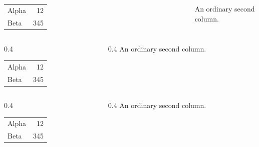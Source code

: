 \documentclass[aspectratio=169]{beamer}
\begin{document}
\begin{frame}[plain,t]
\begin{columns}[T,totalwidth=\textwidth]
\begin{tabular}{lr}
Alpha & 12 \\
Beta & 345 \\
\end{tabular}
An ordinary second column.
\end{columns}
\end{frame}

\begin{frame}[plain,t]
\begin{columns}[T,totalwidth=\textwidth]
\begin{column}{0.4\textwidth}
\begin{tabular}{lr}
Alpha & 12 \\
Beta & 345 \\
\end{tabular}
\end{column}
\begin{column}{0.4\textwidth}
An ordinary second column.
\end{column}
\end{columns}
\end{frame}

\begin{frame}[plain,t]
\begin{columns}[T]
\begin{column}{0.4\textwidth}
\begin{tabular}{lr}
Alpha & 12 \\
Beta & 345 \\
\end{tabular}
\end{column}
\begin{column}{0.4\textwidth}
An ordinary second column.
\end{column}
\end{columns}
\end{frame}
\end{document}
